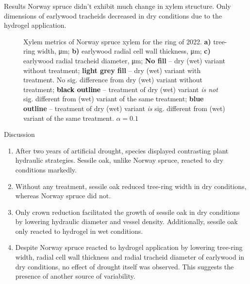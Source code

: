 \documentclass[final]{beamer}
\newlength{\colwidth}
\begin{document}
\begin{frame}[t]
\begin{columns}[t]
\begin{column}{\colwidth}
\begin{block}{Results}
Norway spruce didn't exhibit much change in xylem structure. Only dimensions of earlywood tracheids decreased in dry conditions due to the hydrogel application.

\begin{figure}
    
    \caption{
        Xylem metrics of Norway spruce xylem for the ring of 2022.
        \textbf{a)} tree-ring width, \si{\micro\meter};
        \textbf{b)} earlywood radial cell wall thickness, \si{\micro\meter};
        \textbf{c)} earlywood radial tracheid diameter, \si{\micro\meter};
        \textbf{\colorbox{white}{No fill}} -- dry (wet) variant without treatment;
        \textbf{\colorbox{gray!10}{light grey fill}} -- dry (wet) variant with treatment. No sig. difference from dry (wet) variant without treatment;
        \textbf{\textcolor{black}{black outline}} -- treatment of dry (wet) variant \emph{is not} sig. different from (wet) variant of the same treatment;
        \textbf{\textcolor[RGB]{31,120,180}{blue outline}} -- treatment of dry (wet) variant \emph{is} sig. different from (wet) variant of the same treatment.
        $\alpha = 0.1$
    }
    \label{fig:spruce_box}
\end{figure}
\end{block}

\begin{block}{Discussion}
\begin{multicols}{2}
    \begin{enumerate}
        \item After two years of artificial drought, species displayed contrasting plant hydraulic strategies. Sessile oak, unlike Norway spruce, reacted to dry conditions markedly.
        \item Without any treatment, sessile oak reduced tree-ring width in dry conditions, whereas Norway spruce did not.
        \item Only crown reduction facilitated the growth of sessile oak in dry conditions by lowering hydraulic diameter and vessel density.
            Additionally, sessile oak only reacted to hydrogel in wet conditions.
        \item Despite Norway spruce reacted to hydrogel application by lowering tree-ring width, radial cell wall thickness and radial tracheid diameter of earlywood in dry conditions, no effect of drought itself was observed.
            This suggests the presence of another source of variability.
    \end{enumerate}
\end{multicols}
\end{block}


\end{column}
\end{columns}
\end{frame}
\end{document}
